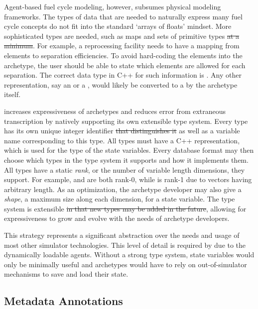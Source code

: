 Agent-based fuel cycle modeling, however, subsumes physical modeling frameworks.
The types of data that are needed to naturally express many fuel cycle concepts 
do not fit into the standard `arrays of floats' mindset.  More sophisticated types are needed,
such as maps and sets of primitive types \sout{at a minimum}. For example, 
a reprocessing facility needs to have a mapping from elements to separation 
efficiencies. To avoid hard-coding the elements into the archetype, the user should 
be able to state which elements are allowed for each separation. The correct data
type in C++ for such information is . Any other 
representation, say an  or a ,  would likely be converted to 
a  by the archetype itself.

\Cyclus increases expressiveness of archetypes and reduces error from extraneous 
transcription by natively supporting its own extensible type system. Every type
has its own unique integer identifier \sout{that distinguishes it }as well as 
a variable name corresponding to this type. All types
must have a C++ representation, which is used for the type of the state
variables.  Every database format may then choose which types in the type system it 
supports and how it implements them. All types have a static \emph{rank}, or the 
number of variable length dimensions, they support.  For example,  and 
 are both rank-0, while  is rank-1 due to 
vectors having arbitrary length. As an optimization, the archetype developer 
may also give a \emph{shape}, a maximum size along each dimension, for a state 
variable. The type system is extensible \sout{in that new types may be added in the future}, 
allowing for expressiveness to grow and evolve with the needs of archetype developers.

This strategy represents a significant abstraction over the needs and usage of most 
other simulator technologies. This level of detail is required by \cyclus due to the
dynamically loadable agents. Without a strong type system, state variables 
would only be minimally useful and archetypes would have to rely on out-of-simulator
mechanisms to save and load their state.

\subsection{Metadata Annotations}

